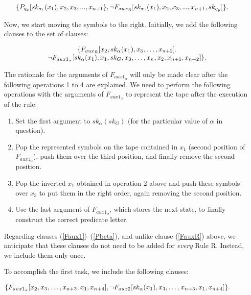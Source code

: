 \documentclass[%
  manuscript=article,   %
  year=2024,
  volume=77,
  doi=00000.000,
]{zfn}
\begin{document}
\begin{equation}
\hspace{-0.5cm} \{P_{q_x}[sk_{\sigma_1}(x_1), x_2, x_3, ..., x_{n+1}\},
 \neg F_{aux_R}[sk_{\sigma_1}(x_1), x_2, x_3, ..., x_{n+1},sk_{q_y}]\}. \label{FauxR}
\end{equation}

Now, we start moving the symbols to the right. Initially, we add the following clauses to the set of clauses:

\begin{equation}
\begin{tabular}{c}$\{F_{aux_R}[x_2, sk_\alpha(x_1), x_3, \dots , x_{n+2}],$ \\
$\neg F_{aux1_\alpha}[sk_\alpha(x_1), x_1, sk_G, x_3, \ldots, x_{n}, x_2, x_{n+1},x_{n+2}]\}.$\end{tabular} \label{Faux1}
\end{equation}

The rationale for the arguments of $F_{aux1_\alpha}$ will only be made clear after the following operations 1 to 4 are explained. We need to perform the following operations with the arguments of $F_{aux1_\alpha}$ to represent the tape after the execution of the rule:

\begin{enumerate}
\item Set the first argument to $sk_\alpha(sk_G)$ (for the particular value of $\alpha$ in question).
\item Pop the represented symbols on the tape contained in $x_1$ (second position of $F_{aux1_\alpha}$), push them over the third position, and finally remove the second position.
\item Pop the inverted $x_1$ obtained in operation 2 above and push these symbols over $x_3$ to put them in the right order, again removing the second position.
\item Use the last argument of $F_{aux1_\alpha}$, which stores the next state, to finally construct the correct predicate letter.
\end{enumerate}

Regarding clauses (\ref{Faux1})--(\ref{Pbeta}), and unlike clause (\ref{FauxR}) above, we anticipate that these clauses do not need to be added for \textit{every} Rule R. Instead, we include them only once.

To accomplish the first task, we include the following clauses:

\begin{small}
\begin{equation}
  \hspace{-1cm}  \{F_{aux1_\alpha}[x_2, x_3, \ldots, x_{n+3}, x_1, x_{n+4}], \neg F_{aux2}[sk_\alpha(x_1), x_3, \ldots, x_{n+3}, x_1, x_{n+4}]\}.\label{Faux2}
\end{equation}
\end{small}
\end{document}
